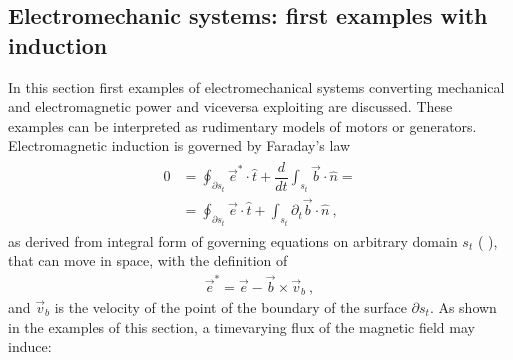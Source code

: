 \documentclass[letterpaper,10pt,english]{jupyterBook}
\begin{document}
\subsection{Electromechanic systems: first examples with induction}
\label{\detokenize{ch/systems-electromechanic-induction-intro:electromechanic-systems-first-examples-with-induction}}\label{\detokenize{ch/systems-electromechanic-induction-intro:classical-electromagnetism-systems-electromechanic-examples-simple}}\label{\detokenize{ch/systems-electromechanic-induction-intro::doc}}
\sphinxAtStartPar
In this section first examples of electromechanical systems converting mechanical and electromagnetic power and viceversa exploiting  are discussed. These examples can be interpreted as rudimentary models of motors or generators. Electromagnetic induction is governed by Faraday’s law
\begin{equation*}
\begin{split}\begin{aligned}
  0 
  & = \oint_{\partial s_t} \vec{e}^* \cdot \hat{t} + \dfrac{d}{dt} \int_{s_t} \vec{b} \cdot \hat{n} = \\
  & = \oint_{\partial s_t} \vec{e}   \cdot \hat{t} +               \int_{s_t} \partial_t \vec{b} \cdot \hat{n}  \ ,
\end{aligned}\end{split}
\end{equation*}
\sphinxAtStartPar
as derived from integral form of governing equations on arbitrary domain \(s_t\) ( ), that can move in space, with the definition of
\begin{equation*}
\begin{split}\vec{e}^* = \vec{e} - \vec{b} \times \vec{v}_b \ ,\end{split}
\end{equation*}
\sphinxAtStartPar
and \(\vec{v}_b\) is the velocity of the point of the boundary of the surface \(\partial s_t\). As shown in the examples of this section, a time\sphinxhyphen{}varying flux of the magnetic field may induce:
\end{document}
